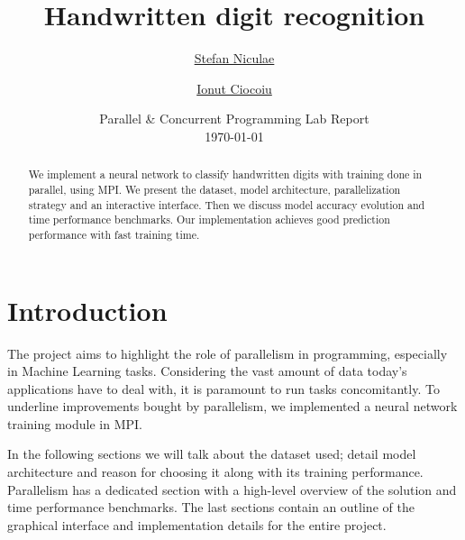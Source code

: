 \documentclass[a4paper]{article}
\begin{document}
	\title{
	\Huge Handwritten digit recognition
	}
	
	\vspace{2cm}
	
	\author{\Large \href{mailto:stefan.niculae@my.fmi.unibuc.ro}{Stefan Niculae} \and \Large \href{mailto:ionut.ciocoiu@my.fmi.unibuc.ro}{Ionut Ciocoiu}
	\vspace{3cm}}
	
	\date{
	\large Parallel \& Concurrent Programming Lab Report \\
    \vspace{0.2cm}
	\today
	}

	\maketitle

\vspace{5cm}
\begin{abstract}
We implement a neural network to classify handwritten digits with training done in parallel, using MPI. We present the dataset, model architecture, parallelization strategy and an interactive interface. Then we discuss model accuracy evolution and time performance benchmarks. Our implementation achieves good prediction performance with fast training time.
\end{abstract}






\newpage
\section{Introduction}
The project aims to highlight the role of parallelism in programming, especially in Machine Learning tasks. Considering the vast amount of data today's applications have to deal with, it is paramount to run tasks concomitantly. To underline  improvements bought by parallelism, we implemented  a neural network training module in MPI.

In the following sections we will talk about the dataset used; detail model architecture and reason for choosing it along with its training performance. Parallelism has a dedicated section with a high-level overview of the solution and time performance benchmarks. The last sections contain an outline of the graphical interface and implementation details for the entire project.
\end{document}

